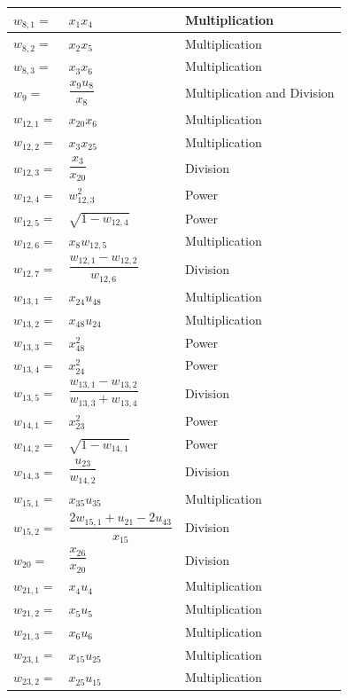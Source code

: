 \begin{longtable}{|p{1.5cm}|l|p{2cm}|}
$w_{8,1}=$ & $ x_{1}x_{4} $ & Multiplication \\ \hline
$w_{8,2}=$ & $ x_{2}x_{5} $ & Multiplication \\ \hline
$w_{8,3}=$ & $ x_{3}x_{6} $ & Multiplication \\ \hline
$w_{9}=$ & $ \dfrac{x_{9}u_{8}}{x_{8}} $ & Multiplication and Division \\ \hline
$w_{12,1}=$ & $ x_{20}x_{6} $ & Multiplication \\ \hline
$w_{12,2}=$ & $ x_{3}x_{25}$ & Multiplication \\ \hline
$w_{12,3}=$ & $ \dfrac{x_{3}}{x_{20}} $ & Division \\ \hline
$w_{12,4}=$ & $ w_{12,3}^{2} $ & Power \\ \hline
$w_{12,5}=$ & $ \sqrt{1-w_{12,4}} $ & Power \\ \hline
$w_{12,6}=$ & $ x_{8}w_{12,5} $ & Multiplication \\ \hline
$w_{12,7}=$ & $ \dfrac{w_{12,1}-w_{12,2}}{w_{12,6}} $ & Division \\ \hline
$w_{13,1}=$ & $ x_{24}u_{48} $ & Multiplication \\ \hline
$w_{13,2}=$ & $ x_{48}u_{24} $ & Multiplication \\ \hline
$w_{13,3}=$ & $ x_{48}^{2} $ & Power \\ \hline
$w_{13,4}=$ & $ x_{24}^{2} $ & Power \\ \hline
$w_{13,5}=$ & $ \dfrac{w_{13,1}-w_{13,2}}{w_{13,3}+w_{13,4}} $ & Division\\ \hline
$w_{14,1}=$ & $ x_{23}^{2} $ & Power \\ \hline
$w_{14,2}=$ & $ \sqrt{1-w_{14,1}} $ & Power \\ \hline
$w_{14,3}=$ & $ \dfrac{u_{23}}{w_{14,2}} $ & Division \\ \hline
$w_{15,1}=$ & $ x_{35}u_{35} $ & Multiplication \\ \hline 
$w_{15,2}=$ & $ \dfrac{2w_{15,1}+u_{21}-2u_{43}}{x_{15}} $ & Division \\ \hline 
$w_{20}=$ & $ \dfrac{x_{26}}{x_{20}} $ & Division \\ \hline
$w_{21,1}=$ & $ x_{4}u_{4} $ & Multiplication \\ \hline
$w_{21,2}=$ & $ x_{5}u_{5} $ & Multiplication \\ \hline
$w_{21,3}=$ & $ x_{6}u_{6} $ & Multiplication \\ \hline
$w_{23,1}=$ & $ x_{15}u_{25} $ & Multiplication \\ \hline
$w_{23,2}=$ & $ x_{25}u_{15} $ & Multiplication \\ \hline

\end{longtable}
